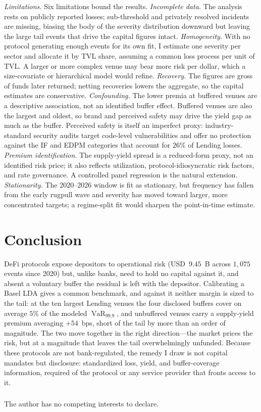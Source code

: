 \documentclass[runningheads]{llncs}
\newcommand{\VaR}{\operatorname{VaR}}
\begin{document}
\emph{Limitations.} Six limitations bound the results.
\emph{Incomplete data.} The analysis rests on publicly reported losses;
sub-threshold and privately resolved incidents are missing, biasing the
body of the severity distribution downward but leaving the large tail
events that drive the capital figures intact.
\emph{Homogeneity.} With no protocol generating enough events for its
own fit, I estimate one severity per sector and allocate it by TVL
share, assuming a common loss process per unit of TVL. A larger or more
complex venue may bear more risk per dollar, which a size-covariate or
hierarchical model would refine. \emph{Recovery.} The figures are gross
of funds later returned; netting recoveries lowers the aggregate, so
the capital estimates are conservative.
\emph{Confounding.} The lower premia at buffered venues are a
descriptive association, not an identified buffer effect. Buffered
venues are also the largest and oldest, so brand and perceived safety
may drive the yield gap as much as the buffer. Perceived safety is
itself an imperfect proxy: industry-standard security audits target
code-level vulnerabilities and offer no protection against the IF and
EDPM categories that account for $26\%$ of Lending losses. \emph{Premium identification.} The supply-yield spread
is a reduced-form proxy, not an identified risk price; it also reflects
utilization, protocol-idiosyncratic risk factors, and rate governance.
A controlled panel regression is the natural extension.
\emph{Stationarity.} The 2020--2026 window is fit as stationary, but
frequency has fallen from the early rugpull wave and severity has
moved toward larger, more concentrated targets; a regime-split fit
would sharpen the point-in-time estimate.


\section{Conclusion}\label{sec:conclusion}

DeFi protocols expose depositors to operational risk
(USD~$9.45$~B across $1{,}075$ events since 2020) but, unlike banks,
need to hold no capital against it, and absent a voluntary buffer the
residual is left with the depositor. Calibrating a Basel LDA gives a
common benchmark, and against it neither margin is sized to the tail:
at the ten largest Lending venues the four disclosed buffers cover on
average $5\%$ of the modeled $\VaR_{99.9}$, and unbuffered venues carry
a supply-yield premium averaging $+54$~bps, short of the tail by more
than an order of magnitude. The two move together in the right direction---the
market prices the risk, but at a magnitude that leaves the tail
overwhelmingly unfunded. Because these protocols are not bank-regulated,
the remedy I draw is not capital mandates but disclosure: standardized
loss, yield, and buffer-coverage information, required of the protocol
or any service provider that fronts access to it.

\begin{credits}
\subsubsection{\discintname}
The author has no competing interests to declare.
\end{credits}



\end{document}
